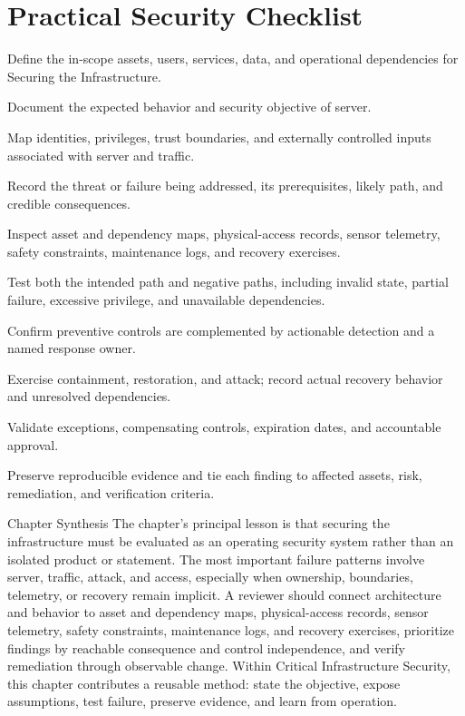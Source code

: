 \documentclass[11pt,letterpaper]{article}
\begin{document}
\section*{Practical Security Checklist}
\begin{CornellChecklist}
\item Define the in-scope assets, users, services, data, and operational dependencies for Securing the Infrastructure.
\item Document the expected behavior and security objective of server.
\item Map identities, privileges, trust boundaries, and externally controlled inputs associated with server and traffic.
\item Record the threat or failure being addressed, its prerequisites, likely path, and credible consequences.
\item Inspect asset and dependency maps, physical-access records, sensor telemetry, safety constraints, maintenance logs, and recovery exercises.
\item Test both the intended path and negative paths, including invalid state, partial failure, excessive privilege, and unavailable dependencies.
\item Confirm preventive controls are complemented by actionable detection and a named response owner.
\item Exercise containment, restoration, and attack; record actual recovery behavior and unresolved dependencies.
\item Validate exceptions, compensating controls, expiration dates, and accountable approval.
\item Preserve reproducible evidence and tie each finding to affected assets, risk, remediation, and verification criteria.
\end{CornellChecklist}
\begin{CornellSummaryBox}{Chapter Synthesis}
The chapter's principal lesson is that securing the infrastructure must be evaluated as an operating security system rather than an isolated product or statement. The most important failure patterns involve server, traffic, attack, and access, especially when ownership, boundaries, telemetry, or recovery remain implicit. A reviewer should connect architecture and behavior to asset and dependency maps, physical-access records, sensor telemetry, safety constraints, maintenance logs, and recovery exercises, prioritize findings by reachable consequence and control independence, and verify remediation through observable change. Within Critical Infrastructure Security, this chapter contributes a reusable method: state the objective, expose assumptions, test failure, preserve evidence, and learn from operation.
\end{CornellSummaryBox}
\end{document}
